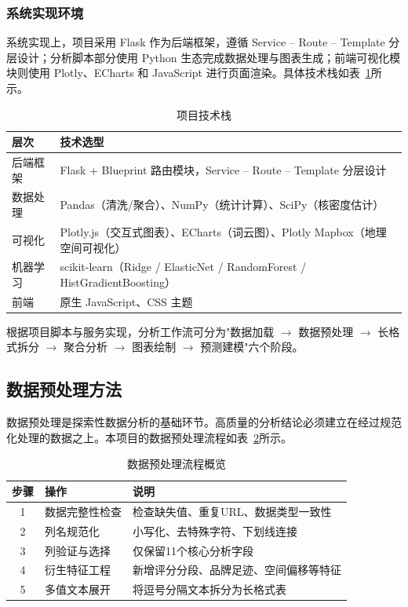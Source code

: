 \documentclass[11pt,a4paper]{article}
\begin{document}
\subsubsection{系统实现环境}

系统实现上，项目采用 Flask 作为后端框架，遵循 Service -- Route -- Template 分层设计；分析脚本部分使用 Python 生态完成数据处理与图表生成；前端可视化模块则使用 Plotly、ECharts 和 JavaScript 进行页面渲染。具体技术栈如表~\ref{tab:techstack}所示。

\begin{table}[H]
\renewcommand{\arraystretch}{1.3}
\caption{项目技术栈}
\label{tab:techstack}
\centering
\begin{tabularx}{\textwidth}{lX}
\toprule
\textbf{层次} & \textbf{技术选型} \\
\midrule
后端框架 & Flask + Blueprint 路由模块，Service -- Route -- Template 分层设计 \\
数据处理 & Pandas（清洗/聚合）、NumPy（统计计算）、SciPy（核密度估计） \\
可视化 & Plotly.js（交互式图表）、ECharts（词云图）、Plotly Mapbox（地理空间可视化） \\
机器学习 & scikit-learn（Ridge / ElasticNet / RandomForest / HistGradientBoosting） \\
前端 & 原生 JavaScript、CSS 主题 \\
\bottomrule
\end{tabularx}
\end{table}

根据项目脚本与服务实现，分析工作流可分为"数据加载 $\rightarrow$ 数据预处理 $\rightarrow$ 长格式拆分 $\rightarrow$ 聚合分析 $\rightarrow$ 图表绘制 $\rightarrow$ 预测建模"六个阶段。

\subsection{数据预处理方法}

数据预处理是探索性数据分析的基础环节。高质量的分析结论必须建立在经过规范化处理的数据之上。本项目的数据预处理流程如表~\ref{tab:preprocessing}所示。

\begin{table}[H]
\renewcommand{\arraystretch}{1.3}
\caption{数据预处理流程概览}
\label{tab:preprocessing}
\centering
\begin{tabularx}{\textwidth}{clX}
\toprule
\textbf{步骤} & \textbf{操作} & \textbf{说明} \\
\midrule
1 & 数据完整性检查 & 检查缺失值、重复URL、数据类型一致性 \\
2 & 列名规范化 & 小写化、去特殊字符、下划线连接 \\
3 & 列验证与选择 & 仅保留11个核心分析字段 \\
4 & 衍生特征工程 & 新增评分分段、品牌足迹、空间偏移等特征 \\
5 & 多值文本展开 & 将逗号分隔文本拆分为长格式表 \\
\bottomrule
\end{tabularx}
\end{table}
\end{document}
